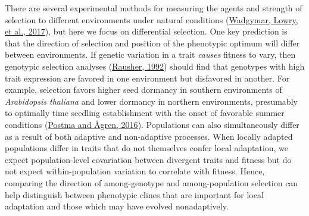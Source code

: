 \documentclass[
  12pt,
]{article}
\begin{document}
There are several experimental methods for measuring the agents and strength of selection to different environments under natural conditions (\protect\hyperlink{ref-wadgymar_identifying_2017}{Wadgymar, Lowry, et al., 2017}), but here we focus on differential selection. One key prediction is that the direction of selection and position of the phenotypic optimum will differ between environments. If genetic variation in a trait \emph{causes} fitness to vary, then genotypic selection analyses (\protect\hyperlink{ref-rausher_measurement_1992}{Rausher, 1992}) should find that genotypes with high trait expression are favored in one environment but disfavored in another. For example, selection favors higher seed dormancy in southern environments of \emph{Arabidopsis thaliana} and lower dormancy in northern environments, presumably to optimally time seedling establishment with the onset of favorable summer conditions (\protect\hyperlink{ref-postma_early_2016}{Postma and Ågren, 2016}). Populations can also simultaneously differ as a result of both adaptive and non-adaptive processes. When locally adapted populations differ in traits that do not themselves confer local adaptation, we expect population-level covariation between divergent traits and fitness but do not expect within-population variation to correlate with fitness. Hence, comparing the direction of among-genotype and among-population selection can help distinguish between phenotypic clines that are important for local adaptation and those which may have evolved nonadaptively.
\end{document}
